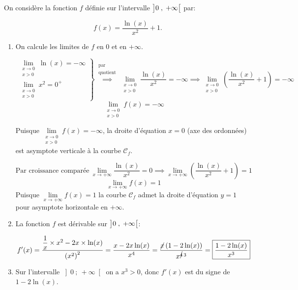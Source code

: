 \smallskip

On considère la fonction $f$ définie sur l'intervalle $\left ]0\;,\;+\infty\strut\right [$ par:

\[f(x)=\dfrac{\ln\left (x\right )}{x^2}+1.\]

\begin{enumerate}
	\item On calcule les limites de $f$ en 0 et en $+\infty$.

	\[\left.
	\begin{array}{l}
		\lim\limits_{\substack{x \to 0\\x > 0}}\ln(x) = -\infty\\[8pt]
		\lim\limits_{\substack{x \to 0\\x > 0}}x^{2} = 0^{+}
	\end{array}\right\} \overset{\substack{\text{par}\\\text{quotient}}}{\implies} \lim_{\substack{x \to 0\\x > 0}}\dfrac{\ln(x)}{x^{2}} = -\infty \implies \lim_{\substack{x \to 0\\x > 0}}\left(\dfrac{\ln(x)}{x^{2}} + 1\right) = -\infty\]
	\smallskip
	\[\boxed{\lim_{\substack{x \to 0\\x > 0}}f(x) = -\infty}\]
	\smallskip

	Puisque $\lim\limits_{\substack{x \to 0\\x > 0}}f(x) = -\infty$, la droite d'équation $x = 0$ (axe des ordonnées) est asymptote verticale à la courbe $\mathcal{C}_{f}$.

\medskip

\[\text{Par croissance comparée}\ \lim_{x \to +\infty}\dfrac{\ln(x)}{x^{2}} = 0 \implies \lim_{x \to +\infty}\left(\dfrac{\ln(x)}{x^{2}} + 1\right) = 1\]
\[\boxed{\lim_{x \to +\infty}f(x) = 1}\]
Puisque $\lim\limits_{x \to +\infty}f(x) = 1$ la courbe $\mathcal{C}_{f}$ admet la droite d'équation $y = 1$ pour asymptote horizontale en $+\infty$.

	\item La fonction $f$ est dérivable sur  $\left ]0\;,\;+\infty\strut\right [$:

	\[f'(x) = \dfrac{\dfrac{1}{x}\times x^{2} - 2x \times \ln(x)}{\left(x^{2}\right)^{2}} = \dfrac{x - 2x\ln(x)}{x^{4}} = \dfrac{\cancel{x}\left(1-2\ln(x)\right)}{x^{\cancel{4}\, 3}} = \boxed{\dfrac{1-2\ln(x)}{x^{3}}}\]

	\item Sur l'intervalle \ensuremath{\left]0~;~+\infty\right[} on a $x^{3} > 0$, donc $f'(x)$ est du signe de $1 - 2\ln(x)$.


\end{enumerate}
